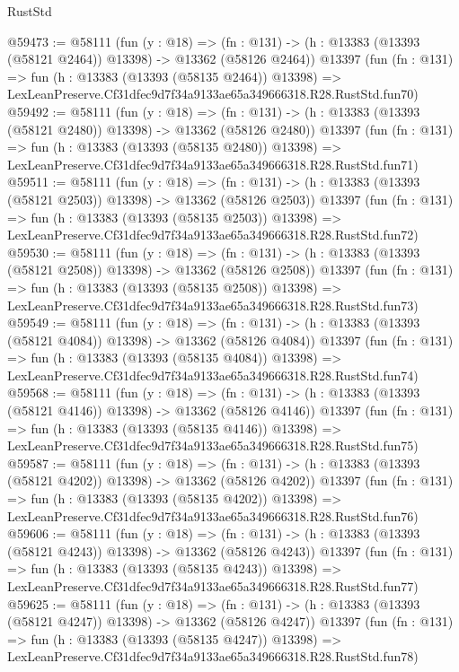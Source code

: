 \begin{lexlean}{RustStd}
\begin{coremodule}
@59473 := @58111
    (fun (y : @18) =>
    (fn : @131) -> (h : @13383 (@13393 (@58121 @2464)) @13398) -> @13362 (@58126 @2464))
    @13397
    (fun (fn : @131) =>
    fun (h : @13383 (@13393 (@58135 @2464)) @13398) =>
    LexLeanPreserve.Cf31dfec9d7f34a9133ae65a349666318.R28.RustStd.fun70)
@59492 := @58111
    (fun (y : @18) =>
    (fn : @131) -> (h : @13383 (@13393 (@58121 @2480)) @13398) -> @13362 (@58126 @2480))
    @13397
    (fun (fn : @131) =>
    fun (h : @13383 (@13393 (@58135 @2480)) @13398) =>
    LexLeanPreserve.Cf31dfec9d7f34a9133ae65a349666318.R28.RustStd.fun71)
@59511 := @58111
    (fun (y : @18) =>
    (fn : @131) -> (h : @13383 (@13393 (@58121 @2503)) @13398) -> @13362 (@58126 @2503))
    @13397
    (fun (fn : @131) =>
    fun (h : @13383 (@13393 (@58135 @2503)) @13398) =>
    LexLeanPreserve.Cf31dfec9d7f34a9133ae65a349666318.R28.RustStd.fun72)
@59530 := @58111
    (fun (y : @18) =>
    (fn : @131) -> (h : @13383 (@13393 (@58121 @2508)) @13398) -> @13362 (@58126 @2508))
    @13397
    (fun (fn : @131) =>
    fun (h : @13383 (@13393 (@58135 @2508)) @13398) =>
    LexLeanPreserve.Cf31dfec9d7f34a9133ae65a349666318.R28.RustStd.fun73)
@59549 := @58111
    (fun (y : @18) =>
    (fn : @131) -> (h : @13383 (@13393 (@58121 @4084)) @13398) -> @13362 (@58126 @4084))
    @13397
    (fun (fn : @131) =>
    fun (h : @13383 (@13393 (@58135 @4084)) @13398) =>
    LexLeanPreserve.Cf31dfec9d7f34a9133ae65a349666318.R28.RustStd.fun74)
@59568 := @58111
    (fun (y : @18) =>
    (fn : @131) -> (h : @13383 (@13393 (@58121 @4146)) @13398) -> @13362 (@58126 @4146))
    @13397
    (fun (fn : @131) =>
    fun (h : @13383 (@13393 (@58135 @4146)) @13398) =>
    LexLeanPreserve.Cf31dfec9d7f34a9133ae65a349666318.R28.RustStd.fun75)
@59587 := @58111
    (fun (y : @18) =>
    (fn : @131) -> (h : @13383 (@13393 (@58121 @4202)) @13398) -> @13362 (@58126 @4202))
    @13397
    (fun (fn : @131) =>
    fun (h : @13383 (@13393 (@58135 @4202)) @13398) =>
    LexLeanPreserve.Cf31dfec9d7f34a9133ae65a349666318.R28.RustStd.fun76)
@59606 := @58111
    (fun (y : @18) =>
    (fn : @131) -> (h : @13383 (@13393 (@58121 @4243)) @13398) -> @13362 (@58126 @4243))
    @13397
    (fun (fn : @131) =>
    fun (h : @13383 (@13393 (@58135 @4243)) @13398) =>
    LexLeanPreserve.Cf31dfec9d7f34a9133ae65a349666318.R28.RustStd.fun77)
@59625 := @58111
    (fun (y : @18) =>
    (fn : @131) -> (h : @13383 (@13393 (@58121 @4247)) @13398) -> @13362 (@58126 @4247))
    @13397
    (fun (fn : @131) =>
    fun (h : @13383 (@13393 (@58135 @4247)) @13398) =>
    LexLeanPreserve.Cf31dfec9d7f34a9133ae65a349666318.R28.RustStd.fun78)

\end{coremodule}
\end{lexlean}
